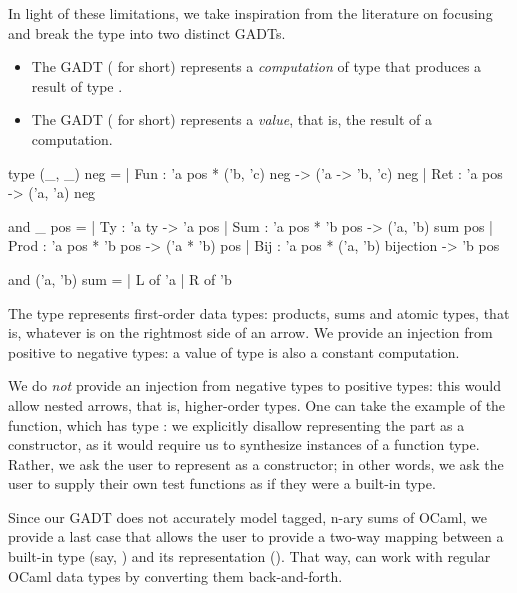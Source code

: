 In light of these limitations, we take inspiration from the literature on
focusing and break the  type into two distinct GADTs.
\begin{itemize}
  \item The GADT  ( for short) represents a
    \emph{computation} of type  that produces a result of type
    .
  \item The GADT  ( for short) represents a
    \emph{value}, that is, the result of a computation.
\end{itemize}
%
\begin{ocamlcode}
type (_, _) neg =
| Fun : 'a pos * ('b, 'c) neg -> ('a -> 'b, 'c) neg
| Ret : 'a pos -> ('a, 'a) neg

and _ pos =
| Ty : 'a ty -> 'a pos
| Sum : 'a pos * 'b pos -> ('a, 'b) sum pos
| Prod : 'a pos  * 'b pos -> ('a * 'b) pos
| Bij : 'a pos * ('a, 'b) bijection -> 'b pos

and ('a, 'b) sum =
| L of 'a
| R of 'b
\end{ocamlcode}
%
The  type represents first-order data types: products, sums and atomic
types, that is, whatever is on the rightmost side of an arrow. We provide an
injection from positive to negative types: a value of type  is also a
constant computation.

We do \emph{not} provide an injection from negative types to positive types:
this would allow nested arrows, that is, higher-order types.  One can take the
example of the  function, which has type : we explicitly disallow representing the  part as a
 constructor, as it would require us to synthesize instances of a
function type. Rather, we ask the user to represent  as a
 constructor; in other words, we ask the user to supply their own test
functions as if they were a built-in type.

Since our GADT does not accurately model tagged, n-ary sums of OCaml, we provide
a last  case that allows the user to provide a two-way mapping between
a built-in type (say, ) and its \arti representation (). That way, \arti can work with regular OCaml data types by converting them
back-and-forth.

